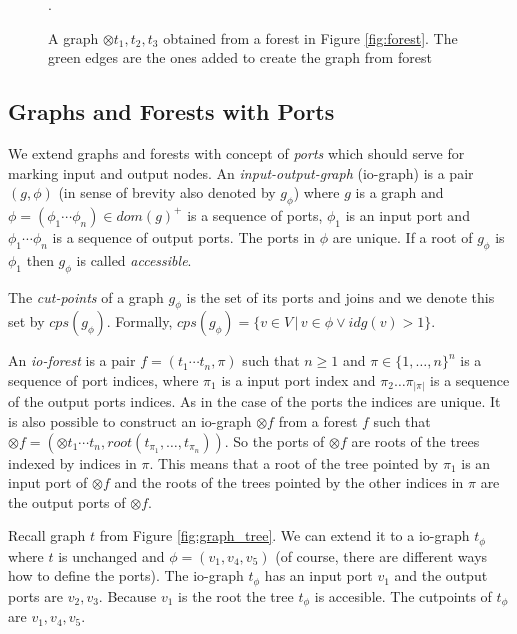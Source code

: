 	\begin{figure}[bth]
	\begin{center}
		
		\caption{A graph $\otimes t_1,t_2,t_3$ obtained from a forest in Figure \ref{fig:forest}.
		The green edges are the ones added to create the graph from forest}.
	  \label{fig:forest_graph}
	\end{center}
	\end{figure}
\eexmp

\subsection{Graphs and Forests with Ports}
\label{subsec:gfp}

We extend graphs and forests with concept of \emph{ports} which should
serve for marking input and output nodes.
An \emph{input-output-graph} (io-graph) is a pair $(g,\phi)$ (in sense of brevity also denoted by $g_\phi$)
where $g$ is a graph and $\phi=(\phi_1 \cdots \phi_n) \in dom(g)^+$ is a sequence of ports, $\phi_1$
is an input port and $\phi_1 \cdots \phi_n$ is a sequence of output ports.
The ports in $\phi$ are unique.
If a root of $g_\phi$ is $\phi_1$ then $g_\phi$ is called \emph{accessible}.

The \emph{cut-points} of a graph $g_\phi$ is the set of its ports and joins and we denote this set by $cps(g_\phi)$.
Formally, $cps(g_\phi)=\{v \in V\,|\, v \in \phi \vee idg(v) > 1\}$.

An \emph{io-forest} is a pair $f=(t_1 \cdots t_n, \pi)$ such that $n \geq 1$ and $\pi \in \{1,\ldots,n\}^n$
is a sequence of port indices, where $\pi_1$ is a input port index and $\pi_2 \ldots \pi_{|\pi|}$ is a sequence
of the output ports indices.
As in the case of the ports the indices are unique.
It is also possible to construct an io-graph $\otimes f$ from a forest $f$ such that
$\otimes f = (\otimes t_1 \cdots t_n,root(t_{\pi_{1}},\ldots,t_{\pi_{n}}))$.
So the ports of $\otimes f$ are roots of the trees indexed by indices in $\pi$.
This means that a root of the tree pointed by $\pi_1$ is an input port of $\otimes f$ and
the roots of the trees pointed by the other indices in $\pi$ are the output ports of $\otimes f$.

\bexmp
Recall graph $t$ from Figure \ref{fig:graph_tree}.
We can extend it to a io-graph $t_\phi$ where $t$ is unchanged and
$\phi=(v_1,v_4,v_5)$ (of course, there are different ways how to define the ports).
The io-graph $t_\phi$ has an input port $v_1$ and the output ports are $v_2,v_3$.
Because $v_1$ is the root the tree $t_\phi$ is accesible.
The cutpoints of $t_\phi$ are $v_1, v_4, v_5$.

